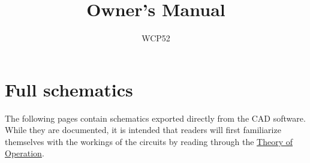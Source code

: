 \documentclass[article,oneside]{memoir}
\title{Owner's Manual}
\author{WCP52}
\begin{document}
\pagestyle{headings}

\begin{multicols}{2}

\tableofcontents
\listoffigures

\newpage


\newpage


\newpage


\newpage



\newpage


\end{multicols}

\newpage
{}

\newpage
\chapter{Full schematics}
The following pages contain schematics exported directly from the CAD software.
While they are documented, it is intended that readers will first familiarize
themselves with the workings of the circuits by reading through the
\hyperref[chap:too]{Theory of Operation}.

\newpage

\end{document}
